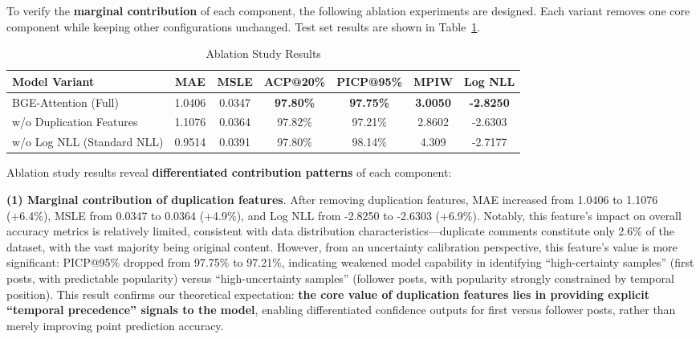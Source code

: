 \documentclass[10pt]{article}
\begin{document}
To verify the \textbf{marginal contribution} of each component, the following ablation experiments are designed. Each variant removes one core component while keeping other configurations unchanged. Test set results are shown in Table~\ref{tab:ablation}.

\begin{table}[H]
\centering
\caption{Ablation Study Results}
\label{tab:ablation}
\begin{tabular}{lcccccc}
\toprule
\textbf{Model Variant} & \textbf{MAE} & \textbf{MSLE} & \textbf{ACP@20\%} & \textbf{PICP@95\%} & \textbf{MPIW} & \textbf{Log NLL} \\
\midrule
BGE-Attention (Full) & 1.0406 & 0.0347 & \textbf{97.80\%} & \textbf{97.75\%} & \textbf{3.0050} & \textbf{-2.8250} \\
w/o Duplication Features & 1.1076 & 0.0364 & 97.82\% & 97.21\% & 2.8602 & -2.6303 \\
w/o Log NLL (Standard NLL) & 0.9514 & 0.0391 & 97.80\% & 98.14\% & 4.309 & -2.7177 \\
\bottomrule
\end{tabular}
\end{table}

Ablation study results reveal \textbf{differentiated contribution patterns} of each component:

\textbf{(1) Marginal contribution of duplication features}. After removing duplication features, MAE increased from 1.0406 to 1.1076 (+6.4\%), MSLE from 0.0347 to 0.0364 (+4.9\%), and Log NLL from -2.8250 to -2.6303 (+6.9\%). Notably, this feature's impact on overall accuracy metrics is relatively limited, consistent with data distribution characteristics---duplicate comments constitute only 2.6\% of the dataset, with the vast majority being original content. However, from an uncertainty calibration perspective, this feature's value is more significant: PICP@95\% dropped from 97.75\% to 97.21\%, indicating weakened model capability in identifying ``high-certainty samples'' (first posts, with predictable popularity) versus ``high-uncertainty samples'' (follower posts, with popularity strongly constrained by temporal position). This result confirms our theoretical expectation: \textbf{the core value of duplication features lies in providing explicit ``temporal precedence'' signals to the model}, enabling differentiated confidence outputs for first versus follower posts, rather than merely improving point prediction accuracy.
\end{document}
